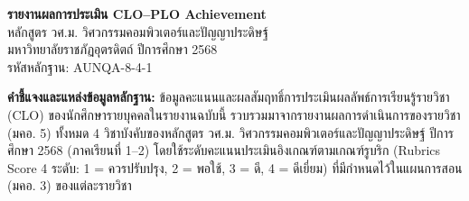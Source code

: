 \documentclass[12pt,a4paper]{article}
\begin{document}
\begin{center}
{\Large\bfseries รายงานผลการประเมิน CLO--PLO Achievement}\\[4pt]
{\large หลักสูตร วศ.ม. วิศวกรรมคอมพิวเตอร์และปัญญาประดิษฐ์}\\[2pt]
{\large มหาวิทยาลัยราชภัฏอุตรดิตถ์ \quad ปีการศึกษา 2568}\\[2pt]
{\normalsize รหัสหลักฐาน: AUNQA-8-4-1}
\end{center}
\vspace{0.2cm}
\noindent\textbf{คำชี้แจงและแหล่งข้อมูลหลักฐาน:} ข้อมูลคะแนนและผลสัมฤทธิ์การประเมินผลลัพธ์การเรียนรู้รายวิชา (CLO) ของนักศึกษารายบุคคลในรายงานฉบับนี้ รวบรวมมาจากรายงานผลการดำเนินการของรายวิชา (มคอ. 5) ทั้งหมด 4 วิชาบังคับของหลักสูตร วศ.ม. วิศวกรรมคอมพิวเตอร์และปัญญาประดิษฐ์ ปีการศึกษา 2568 (ภาคเรียนที่ 1--2) โดยใช้ระดับคะแนนประเมินอิงเกณฑ์ตามเกณฑ์รูบริก (Rubrics Score 4 ระดับ: 1 = ควรปรับปรุง, 2 = พอใช้, 3 = ดี, 4 = ดีเยี่ยม) ที่มีกำหนดไว้ในแผนการสอน (มคอ. 3) ของแต่ละรายวิชา
\vspace{0.3cm}
\end{document}
